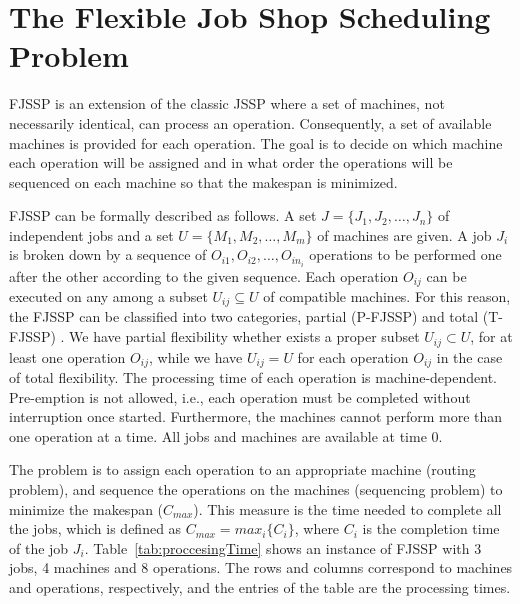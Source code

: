 \section{The Flexible Job Shop Scheduling Problem} \label{sec:FJSSP}
\vspace{-0.4cm}

FJSSP is an extension of the classic JSSP where a set of machines, not necessarily identical, can process an operation. Consequently, a set of available machines is provided for each operation. The goal is to decide on which machine each operation will be assigned and in what order the operations will be sequenced on each machine so that the makespan is minimized.

FJSSP can be formally described as follows. A set $J = \{J_1, J_2,\ldots, J_n\}$ of independent jobs and a set $U = \{M_1,M_2, \ldots, M_m\}$ of machines are given. A job $J_i$ is broken down by a sequence of $O_{i1},O_{i2}, \ldots, O_{in_i}$ operations to be performed one after the other according to the given sequence. Each operation $O_{ij}$ can be executed on any among a subset $U_{ij} \subseteq U$ of compatible machines. For this reason, the FJSSP can be classified into two categories, partial (P-FJSSP) and total (T-FJSSP)  \cite{kacem2002}. We have partial flexibility whether exists a proper subset $U_{ij} \subset U$, for at least one operation $O_{ij}$, while we have $U_{ij} =U$ for each operation $O_{ij}$ in the case of total flexibility. The processing time of each operation is machine-dependent. 
Pre-emption is not allowed, i.e., each operation must be completed without interruption once started. Furthermore, the machines cannot perform more than one operation at a time. All jobs and machines are available at time 0.

The problem is to assign each operation to an appropriate machine (routing problem),  and  sequence the operations on the machines (sequencing problem) to minimize the makespan ($C_{max}$). This measure is the time needed to complete all the jobs, which is defined as $C_{max} = max_i\{C_i\}$, where $C_i$ is the completion time of the job $J_i$.  Table~\ref{tab:proccesingTime} shows an instance of FJSSP with 3 jobs, 4 machines and 8 operations. The rows and columns correspond to machines and operations, respectively, and the entries of the table are the processing times. 

